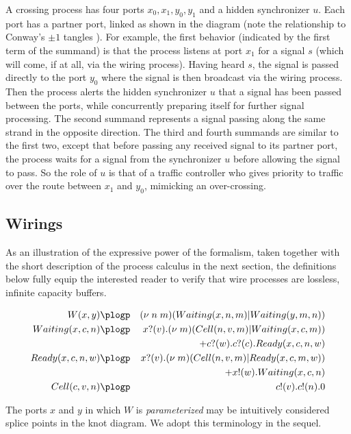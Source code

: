 A crossing process has four ports $x_0,x_1,y_0,y_1$ and a hidden
synchronizer $u$. Each port has a partner port, linked as shown in the
diagram (note the relationship to Conway's $\pm 1$ tangles
\cite{Conway1970An-enumeration-}). For example, the first behavior (indicated by the first
term of the summand) is that the process listens at port $x_1$ for a
signal $s$ (which will come, if at all, via the wiring
process). Having heard $s$, the signal is passed directly to the port
$y_0$ where the signal is then broadcast via the wiring process. Then
the process alerts the hidden synchronizer $u$ that a signal has been
passed between the ports, while concurrently preparing itself for
further signal processing. The second summand represents a signal
passing along the same strand in the opposite direction. The third and
fourth summands are similar to the first two, except that before
passing any received signal to its partner port, the process waits for
a signal from the synchronizer $u$ before allowing the signal to
pass. So the role of $u$ is that of a traffic controller who gives
priority to traffic over the route between $x_1$ and $y_0$, mimicking
an over-crossing.

\subsection{Wirings}\label{sub:wirings} %

As an illustration of the expressive power of the formalism, taken
together with the short description of the process calculus in the next
section, the definitions below fully equip the interested reader to
verify that wire processes are lossless, infinite capacity buffers. 


\begin{eqnarray*}
    W(x,y) & \plogp & (\nu \; n \; m)(Waiting(x,n,m) | Waiting(y,m,n)) \nonumber \\
Waiting(x,c,n) & \plogp   & x?(v).(\nu \; m)(Cell(n,v,m) | Waiting(x,c,m)) \nonumber \\
  & & + c?(w).c?(c).Ready(x,c,n,w) \nonumber \\
  Ready(x,c,n,w) & \plogp  & x?(v).(\nu \; m)(Cell(n,v,m) | Ready(x,c,m,w)) \nonumber \\
  & & + x!(w).Waiting(x,c,n) \nonumber \\
  Cell(c,v,n) & \plogp & c!(v).c!(n).0 \nonumber
\end{eqnarray*}

The ports $x$ and $y$ in which $W$ is \emph{parameterized} may be
intuitively considered splice points in the knot diagram. We adopt
this terminology in the sequel.

